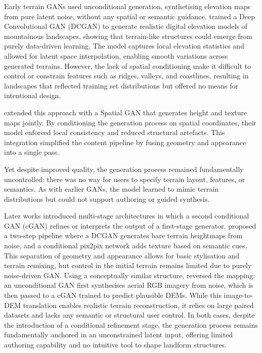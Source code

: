 Early terrain GANs used unconditional generation, synthetising elevation maps from pure latent noise, without any spatial or semantic guidance. \cite{WulffJensen2018} trained a Deep Convolutional GAN (DCGAN) to generate realistic digital elevation models of mountainous landscapes, showing that terrain-like structures could emerge from purely data-driven learning. The model captures local elevation statistics and allowed for latent space interpolation, enabling smooth variations across generated terrains. However, the lack of spatial conditioning make it difficult to control or constrain features such as ridges, valleys, and coastlines, resulting in landscapes that reflected training set distributions but offered no means for intentional design.

\cite{Spick2019} extended this approach with a Spatial GAN that generates height and texture maps jointly. By conditioning the generation process on spatial coordinates, their model enforced local consistency and reduced structural artefacts. This integration simplified the content pipeline by fusing geometry and appearance into a single pass. 

Yet despite improved quality, the generation process remained fundamentally uncontrolled: there was no way for users to specify terrain layout, features, or semantics. As with earlier GANs, the model learned to mimic terrain distributions but could not support authoring or guided synthesis.

Later works introduced multi-stage architectures in which a second conditional GAN (cGAN) refines or interprets the output of a first-stage generator. \cite{Beckham2017} proposed a two-step pipeline where a DCGAN generates bare terrain heightmaps from noise, and a conditional pix2pix network adds texture based on semantic cues. This separation of geometry and appearance allows for basic stylisation and terrain remixing, but control in the initial terrain remains limited due to purely noise-driven GAN. Using a conceptually similar structure, \cite{Panagiotou2020} reversed the mapping: an unconditional GAN first synthesises aerial RGB imagery from noise, which is then passed to a cGAN trained to predict plausible DEMs. While this image-to-DEM translation enables realistic terrain reconstruction, it relies on large paired datasets and lacks any semantic or structural user control. In both cases, despite the introduction of a conditional refinement stage, the generation process remains fundamentally anchored in an unconstrained latent input, offering limited authoring capability and no intuitive tool to shape landform structures.

